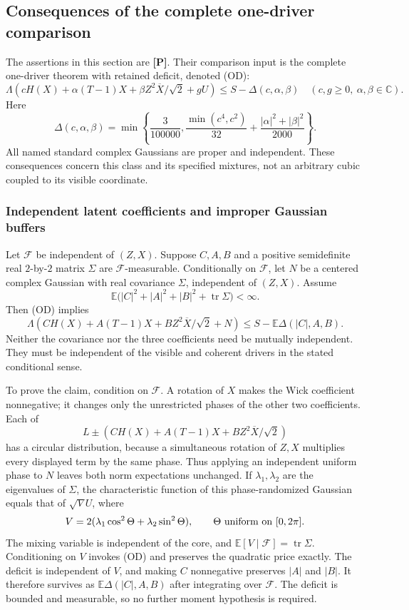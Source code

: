 \subsection{Consequences of the complete one-driver comparison}
\label{sec:milestone-closures}

The assertions in this section are \textbf{[P]}. Their comparison input
is the complete one-driver theorem with retained deficit, denoted (OD):
\[
 \Lambda\!\left(cH(X)+\alpha(T-1)X+
       \beta Z^2\overline X/\sqrt2+gU\right)\le S-\Delta(c,\alpha,\beta)
 \quad(c,g\ge0,\ \alpha,\beta\in\mathbb C).
\]
Here
\[
\Delta(c,\alpha,\beta)=\min\left\{\frac3{100000},
\frac{\min(c^4,c^2)}{32}+\frac{|\alpha|^2+|\beta|^2}{2000}\right\}.
\]
All named standard complex Gaussians are proper and independent.
These consequences concern this class and its specified mixtures, not
an arbitrary cubic coupled to its visible coordinate.

\subsubsection{Independent latent coefficients and improper Gaussian buffers}
Let $\mathcal F$ be independent of $(Z,X)$. Suppose $C,A,B$ and a
positive semidefinite real $2$-by-$2$ matrix $\Sigma$ are
$\mathcal F$-measurable. Conditionally on $\mathcal F$, let $N$ be a
centered complex Gaussian with real covariance $\Sigma$, independent
of $(Z,X)$. Assume
\[
 \mathbb E\bigl(|C|^2+|A|^2+|B|^2+\operatorname{tr}\Sigma\bigr)<\infty.
\]
Then (OD) implies
\[
 \boxed{\Lambda\!\left(CH(X)+A(T-1)X+
                  BZ^2\overline X/\sqrt2+N\right)\le S-\mathbb E\Delta(|C|,A,B).}
\]
Neither the covariance nor the three coefficients need be mutually
independent. They must be independent of the visible and coherent
drivers in the stated conditional sense.

To prove the claim, condition on $\mathcal F$. A rotation of $X$
makes the Wick coefficient nonnegative; it changes only the unrestricted
phases of the other two coefficients. Each of
\[
 L\pm\left(CH(X)+A(T-1)X+BZ^2\overline X/\sqrt2\right)
\]
has a circular distribution, because a simultaneous rotation of $Z,X$
multiplies every displayed term by the same phase. Thus applying an
independent uniform phase to $N$ leaves both norm expectations
unchanged. If $\lambda_1,\lambda_2$ are the eigenvalues of $\Sigma$,
the characteristic function of this phase-randomized Gaussian equals
that of $\sqrt VU$, where
\[
 V=2(\lambda_1\cos^2\Theta+\lambda_2\sin^2\Theta),\qquad
 \Theta\ \hbox{uniform on }[0,2\pi].
\]
The mixing variable is independent of the core, and
$\mathbb E[V\mid\mathcal F]=\operatorname{tr}\Sigma$.
Conditioning on $V$ invokes (OD) and preserves the quadratic price
exactly. The deficit is independent of $V$, and making $C$
nonnegative preserves $|A|$ and $|B|$. It therefore survives as
$\mathbb E\Delta(|C|,A,B)$ after integrating over $\mathcal F$.
The deficit is bounded and measurable, so no further moment
hypothesis is required.

